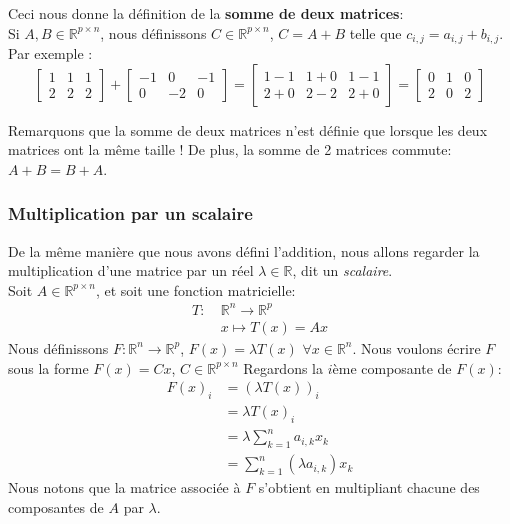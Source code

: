 \documentclass{article}
\newcommand{\R}{\mathbb{R}}
\newcommand{\cross}{\times}
\begin{document}
\noindent Ceci nous donne la définition de la \textbf{somme de deux matrices}: \\
\noindent Si $A,B \in \R^{p \cross n}$, nous définissons $C \in \R^{p \cross n}$, $C = A+B$ telle que $c_{i,j} = a_{i,j}+b_{i,j}$. Par exemple :
$$\begin{bmatrix} 1 & 1 & 1 \\ 2 & 2 & 2 \end{bmatrix} + \begin{bmatrix} -1 & 0 & -1 \\ 0 & -2 & 0 \end{bmatrix} = \begin{bmatrix} 1-1 & 1+0 & 1-1 \\ 2+0 & 2-2 & 2+0 \end{bmatrix} = \begin{bmatrix} 0 & 1 & 0 \\ 2 & 0 & 2 \end{bmatrix}
$$

\noindent Remarquons que la somme de deux matrices n'est définie que lorsque les deux matrices ont la même taille ! De plus, la somme de 2 matrices commute: $A+B = B+A$.

\subsubsection{Multiplication par un scalaire}
\noindent De la même manière que nous avons défini l'addition, nous allons regarder la multiplication d'une matrice par un réel $\lambda \in \R$, dit un \textit{scalaire}. \\

\noindent Soit $A\in \R^{p \cross n}$, et soit une fonction matricielle:
\begin{align*}
    T: \ &\R^n \to \R^p\\
    &x \mapsto T(x) = Ax
\end{align*}
Nous définissons $F: \R^n \to \R^p$, $F(x) = \lambda T(x)$ $\forall x \in \R^n$. Nous voulons écrire $F$ sous la forme $F(x) = Cx$, $C \in \R^{p \cross n}$ Regardons la $i$ème composante de $F(x)$:
\begin{align*}
    F(x)_i &= (\lambda T(x))_i \\
    &= \lambda T(x)_i \\
    &= \lambda \sum_{k=1}^{n} a_{i,k} x_k \\
    &= \sum_{k=1}^{n} (\lambda a_{i,k}) x_k
\end{align*}
Nous notons que la matrice associée à $F$ s'obtient en multipliant chacune des composantes de $A$ par $\lambda$.\\
\end{document}
